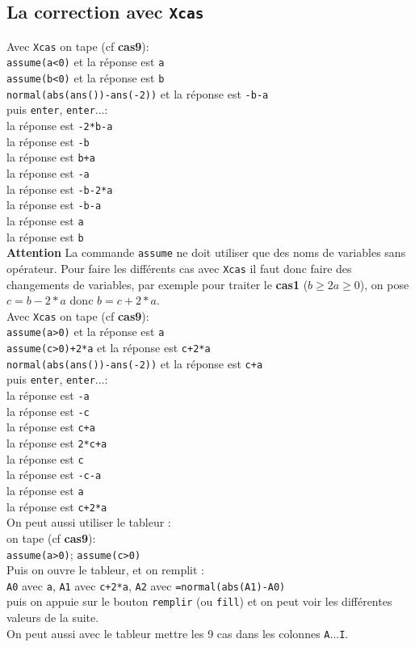 \documentclass[a4paper,11pt]{book}
\begin{document}
\subsection{La correction avec {\tt Xcas}}
Avec {\tt Xcas} on tape (cf {\bf cas9}):\\
{\tt assume(a<0)} et la r\'eponse est {\tt a}\\
{\tt assume(b<0)} et la r\'eponse est {\tt b}\\
{\tt normal(abs(ans())-ans(-2))} et la r\'eponse est {\tt -b-a}\\
puis {\tt enter}, {\tt enter}...:\\
la r\'eponse est {\tt -2*b-a}\\
la r\'eponse est {\tt -b}\\
la r\'eponse est {\tt b+a}\\
la r\'eponse est {\tt -a}\\
la r\'eponse est {\tt -b-2*a}\\
la r\'eponse est {\tt -b-a}\\
la r\'eponse est {\tt a}\\
la r\'eponse est {\tt b}\\
{\bf Attention} La commande {\tt assume} ne doit utiliser que des noms de 
variables sans op\'erateur.  Pour faire les diff\'erents cas avec {\tt Xcas} 
il faut donc faire des changements 
de variables, par exemple pour traiter le {\bf cas1}  ($b \geq 2a \geq 0$),
on pose $c=b-2*a$ donc $b=c+2*a$.\\
Avec {\tt Xcas} on tape (cf {\bf cas9}):\\
{\tt assume(a>0)} et la r\'eponse est {\tt a}\\
{\tt assume(c>0)+2*a} et la r\'eponse est {\tt c+2*a}\\
{\tt normal(abs(ans())-ans(-2))} et la r\'eponse est {\tt c+a}\\
puis {\tt enter}, {\tt enter}...:\\
la r\'eponse est {\tt -a}\\
la r\'eponse est {\tt -c}\\
la r\'eponse est {\tt c+a}\\
la r\'eponse est {\tt 2*c+a}\\
la r\'eponse est {\tt c}\\
la r\'eponse est {\tt -c-a}\\
la r\'eponse est {\tt a}\\
la r\'eponse est {\tt c+2*a}\\
On peut aussi utiliser le tableur :\\
on tape (cf {\bf cas9}):\\
{\tt assume(a>0)}; {\tt assume(c>0)}\\
Puis on ouvre le tableur, et on remplit :\\
{\tt A0} avec {\tt a}, {\tt A1} avec {\tt c+2*a}, {\tt A2} avec {\tt =normal(abs(A1)-A0)}\\ 
puis on appuie sur le bouton {\tt remplir} (ou {\tt fill})
et on peut voir les diff\'erentes valeurs de la suite.\\
On peut aussi avec le tableur mettre les 9 cas dans les colonnes {\tt A}...{\tt I}.
\end{document}

